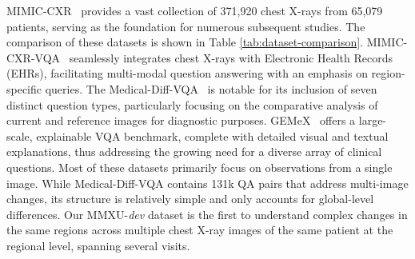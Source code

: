 MIMIC-CXR~\cite{johnson2019mimic} provides a vast collection of 371,920 chest X-rays from 65,079 patients, serving as the foundation for numerous subsequent studies. The comparison of these datasets is shown in Table \ref{tab:dataset-comparison}.  MIMIC-CXR-VQA~\cite{bae2024ehrxqa} seamlessly integrates chest X-rays with Electronic Health Records (EHRs), facilitating multi-modal question answering with an emphasis on region-specific queries. The Medical-Diff-VQA~\cite{hu2023medical} is notable for its inclusion of seven distinct question types, particularly focusing on the comparative analysis of current and reference images for diagnostic purposes. GEMeX~\cite{liu2024gemex} offers a large-scale, explainable VQA benchmark, complete with detailed visual and textual explanations, thus addressing the growing need for a diverse array of clinical questions. Most of these datasets primarily focus on observations from a single image. While Medical-Diff-VQA contains 131k QA pairs that address multi-image changes, its structure is relatively simple and only accounts for global-level differences. Our MMXU-\textit{dev} dataset is the first to understand complex changes in the same regions across multiple chest X-ray images of the same patient at the regional level, spanning several visits.